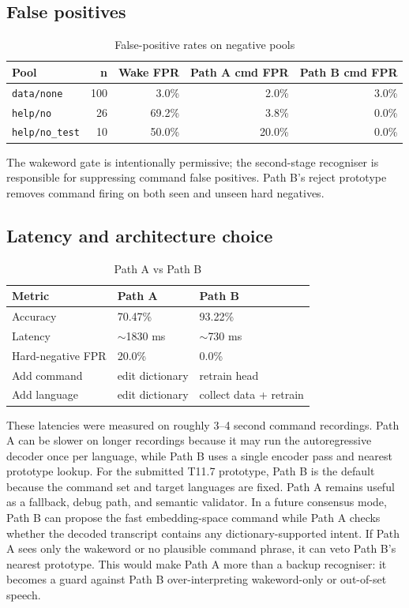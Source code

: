 \documentclass[11pt]{article}
\begin{document}
\subsection{False positives}

\begin{table}[h]
\centering
\caption{False-positive rates on negative pools}
\begin{tabular}{lrrrr}
\toprule
Pool & n & Wake FPR & Path A cmd FPR & Path B cmd FPR \\
\midrule
\texttt{data/none} & 100 & 3.0\% & 2.0\% & 3.0\% \\
\texttt{help/no} & 26 & 69.2\% & 3.8\% & 0.0\% \\
\texttt{help/no\_test} & 10 & 50.0\% & 20.0\% & 0.0\% \\
\bottomrule
\end{tabular}
\end{table}

The wakeword gate is intentionally permissive; the second-stage recogniser is
responsible for suppressing command false positives. Path B's reject prototype
removes command firing on both seen and unseen hard negatives.

\subsection{Latency and architecture choice}

\begin{table}[h]
\centering
\caption{Path A vs Path B}
\begin{tabular}{lll}
\toprule
Metric & Path A & Path B \\
\midrule
Accuracy & 70.47\% & 93.22\% \\
Latency & $\sim$1830 ms & $\sim$730 ms \\
Hard-negative FPR & 20.0\% & 0.0\% \\
Add command & edit dictionary & retrain head \\
Add language & edit dictionary & collect data + retrain \\
\bottomrule
\end{tabular}
\end{table}

These latencies were measured on roughly 3--4 second command recordings. Path
A can be slower on longer recordings because it may run the autoregressive
decoder once per language, while Path B uses a single encoder pass and nearest
prototype lookup. For the submitted T11.7 prototype, Path B is the default
because the command set and target languages are fixed. Path A remains useful
as a fallback, debug path, and semantic validator. In a future consensus mode,
Path B can propose the fast embedding-space command while Path A checks whether
the decoded transcript contains any dictionary-supported intent. If Path A sees
only the wakeword or no plausible command phrase, it can veto Path B's nearest
prototype. This would make Path A more than a backup recogniser: it becomes a
guard against Path B over-interpreting wakeword-only or out-of-set speech.
\end{document}
